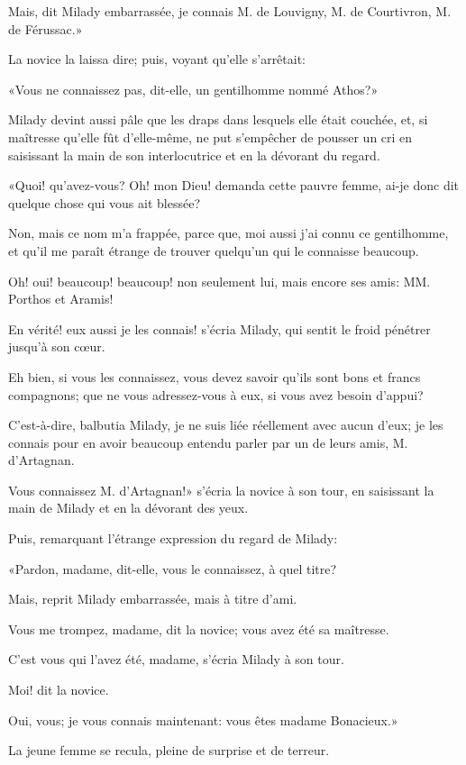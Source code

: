 \speak  Mais, dit Milady embarrassée, je connais M. de Louvigny, M. de Courtivron, M. de Férussac.» 

La novice la laissa dire; puis, voyant qu'elle s'arrêtait: 

«Vous ne connaissez pas, dit-elle, un gentilhomme nommé Athos?» 

Milady devint aussi pâle que les draps dans lesquels elle était couchée, et, si maîtresse qu'elle fût d'elle-même, ne put s'empêcher de pousser un cri en saisissant la main de son interlocutrice et en la dévorant du regard. 

«Quoi! qu'avez-vous? Oh! mon Dieu! demanda cette pauvre femme, ai-je donc dit quelque chose qui vous ait blessée? 

\speak  Non, mais ce nom m'a frappée, parce que, moi aussi j'ai connu ce gentilhomme, et qu'il me paraît étrange de trouver quelqu'un qui le connaisse beaucoup. 

\speak  Oh! oui! beaucoup! beaucoup! non seulement lui, mais encore ses amis: MM. Porthos et Aramis! 

\speak  En vérité! eux aussi je les connais! s'écria Milady, qui sentit le froid pénétrer jusqu'à son cœur. 

\speak  Eh bien, si vous les connaissez, vous devez savoir qu'ils sont bons et francs compagnons; que ne vous adressez-vous à eux, si vous avez besoin d'appui? 

\speak  C'est-à-dire, balbutia Milady, je ne suis liée réellement avec aucun d'eux; je les connais pour en avoir beaucoup entendu parler par un de leurs amis, M. d'Artagnan. 

\speak  Vous connaissez M. d'Artagnan!» s'écria la novice à son tour, en saisissant la main de Milady et en la dévorant des yeux. 

Puis, remarquant l'étrange expression du regard de Milady: 

«Pardon, madame, dit-elle, vous le connaissez, à quel titre? 

\speak  Mais, reprit Milady embarrassée, mais à titre d'ami. 

\speak  Vous me trompez, madame, dit la novice; vous avez été sa maîtresse. 

\speak  C'est vous qui l'avez été, madame, s'écria Milady à son tour. 

\speak  Moi! dit la novice. 

\speak  Oui, vous; je vous connais maintenant: vous êtes madame Bonacieux.» 

La jeune femme se recula, pleine de surprise et de terreur. 

